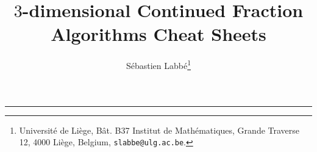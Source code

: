 \documentclass[10pt,landscape,a4paper]{article}
\begin{document}
\title{$3$-dimensional Continued Fraction Algorithms Cheat Sheets}
\author{Sébastien Labbé\footnote{
Université de Liège,
B\^at. B37 Institut de Math\'ematiques,
Grande Traverse 12,
4000 Li\`ege,
Belgium,
\texttt{slabbe@ulg.ac.be}.}}
\date{}

\maketitle



\thispagestyle{empty} %


\begin{multicols}{2}

\columnbreak
\tableofcontents
\end{multicols}

\raggedright

\newpage

\begin{multicols}{3}
\setlength{\premulticols}{1pt}
\setlength{\postmulticols}{1pt}
\setlength{\multicolsep}{1pt}
\setlength{\columnsep}{2pt}
\newcommand{\note}[1]{\hfill\textrm{\textcolor{gray}{#1}}}
\newcommand{\args}[1]{\textit{\textcolor{blue}{#1}}}
\newcommand{\stdout}[1]{\textcolor{Sepia}{#1}}
\footnotesize


\end{multicols}

\footnotesize


\begin{multicols}{3}
\setlength{\premulticols}{1pt}
\setlength{\postmulticols}{1pt}
\setlength{\multicolsep}{1pt}
\setlength{\columnsep}{2pt}
\newcommand{\note}[1]{\hfill\textrm{\textcolor{gray}{#1}}}
\newcommand{\args}[1]{\textit{\textcolor{blue}{#1}}}
\newcommand{\stdout}[1]{\textcolor{Sepia}{#1}}
\raggedright
\footnotesize




\rule{0.3\linewidth}{0.25pt}
\scriptsize



\end{multicols}
\end{document}
